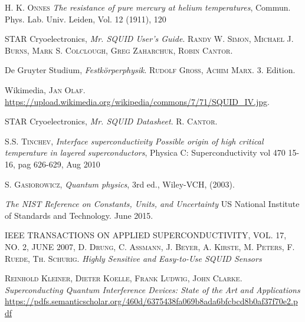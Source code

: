 \documentclass[a4paper,10pt]{article}
\begin{document}
\begin{thebibliography}{99}
 \textsc{H. K. Onnes} \textit{The resistance of pure mercury at helium temperatures}, Commun. Phys. Lab. Univ. Leiden, Vol. 12 (1911), 120 

STAR Cryoelectronics, \textit{Mr. SQUID User's  Guide}. \textsc{Randy W. Simon, Michael J. Burns, Mark S. Colclough, Greg Zaharchuk, Robin Cantor}. 

De Gruyter Studium, \textit{Festkörperphysik}. \textsc{Rudolf Gross, Achim Marx}. 3. Edition.

Wikimedia, \textsc{Jan Olaf}. \url{https://upload.wikimedia.org/wikipedia/commons/7/71/SQUID_IV.jpg}.

STAR Cryoelectronics, \textit{Mr. SQUID Datasheet}. \textsc{R. Cantor}. 

  \textsc{S.S. Tinchev}, \textit{Interface superconductivity {\textendash} Possible origin of high critical temperature in layered superconductors}, Physica C: Superconductivity vol 470 15-16, pag 626-629, Aug 2010

\textsc{S. Gasiorowicz}, \textit{Quantum physics}, 3rd ed., Wiley-VCH, (2003).

\textit{The NIST Reference on Constants, Units, and Uncertainty} US National Institute of Standards and Technology. June 2015. 

IEEE TRANSACTIONS ON APPLIED SUPERCONDUCTIVITY, VOL. 17, NO. 2, JUNE 2007, \textsc{D. Drung, C. Aßmann, J. Beyer, A. Kirste, M. Peters, F. Ruede, Th. Schurig}. \textit{Highly Sensitive and Easy-to-Use SQUID Sensors}

\textsc{Reinhold Kleiner, Dieter Koelle, Frank Ludwig, John Clarke}. \textit{Superconducting Quantum Interference Devices: State of the Art and Applications} \url{https://pdfs.semanticscholar.org/460d/6375438fa069b8ada6bfcbcd8b0af37f70e2.pdf}

\end{thebibliography}
\end{document}
